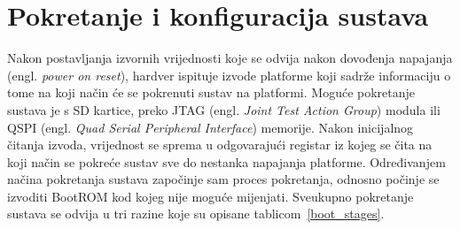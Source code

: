 \documentclass[times, utf8, diplomski, numeric]{fer}
\begin{document}
\section{Pokretanje i konfiguracija sustava}
Nakon postavljanja izvornih vrijednosti koje se odvija nakon dovođenja napajanja (engl. \textit{power
on reset}), hardver ispituje izvode platforme koji sadrže informaciju o tome na koji način će se pokrenuti sustav na
platformi. Moguće pokretanje sustava je s SD kartice, preko JTAG (engl. \textit{Joint Test Action Group}) modula
ili QSPI (engl. \textit{Quad Serial Peripheral Interface}) memorije. Nakon inicijalnog
čitanja izvoda, vrijednost se sprema u odgovarajući registar iz kojeg se čita na koji način se pokreće sustav sve do
nestanka napajanja platforme. Određivanjem načina pokretanja sustava započinje sam proces pokretanja, odnosno
počinje se izvoditi BootROM kod kojeg nije moguće mijenjati. Sveukupno pokretanje sustava se odvija u tri razine
koje su opisane tablicom~\ref{boot_stages}.
\end{document}
